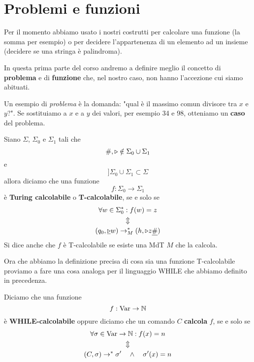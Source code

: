 \section{Problemi e funzioni}
Per il momento abbiamo usato i nostri costrutti per calcolare
una funzione (la somma per esempio) o per decidere
l'appartenenza di un elemento ad un insieme (decidere se una
stringa è palindroma).

In questa prima parte del corso andremo a definire meglio il
concetto di \textbf{problema} e di \textbf{funzione} che, nel
nostro caso, non hanno l'accezione cui siamo abituati.

Un esempio di \emph{problema} è la domanda: "qual è il massimo
comun divisore tra $x$ e $y$?". Se sostituiamo a $x$ e a $y$
dei valori, per esempio 34 e 98, otteniamo un \textbf{caso}
del problema.

\begin{definition} \label{def: T-calcolabile}
	Siano $\Sigma$, $\Sigma_0$ e $\Sigma_1$ tali che
	\[ \#, \triangleright \notin \Sigma_0 \cup \Sigma_1 \]
	e
	\[ ]\Sigma_0 \cup \Sigma_1 \subset \Sigma \]
	allora diciamo che una funzione
	\[ f : \Sigma_0 \to \Sigma_1 \]
	è \textbf{Turing calcolabile} o \textbf{T-calcolabile},
	se e solo se
	\begin{gather*}
		\forall w \in \Sigma_0^* : f(w) = z \\
		\Updownarrow \\
		(q_0, \underline{\triangleright} w) \to_M^*
		(h, \triangleright z \underline{\#})
	\end{gather*}
	Si dice anche che $f$ è T-calcolabile se esiste una MdT
	$M$ che la calcola.
\end{definition}

Ora che abbiamo la definizione precisa di cosa sia una
funzione T-calcolabile proviamo a fare una cosa analoga per
il linguaggio WHILE che abbiamo definito in precedenza.

\begin{definition} \label{def: while-calcolabile}
	Diciamo che una funzione
	\[ f : \operatorname{Var} \to \mathbb{N} \]
	è \textbf{WHILE-calcolabile} oppure diciamo che un comando
	$C$ \textbf{calcola} $f$, se e solo se
	\begin{gather*}
		\forall \sigma \in \operatorname{Var} \to \mathbb{N} : f(x) = n \\
		\Updownarrow \\
		(C, \sigma) \to^* \sigma' \quad \land \quad
		\sigma'(x) = n
	\end{gather*}
\end{definition}

